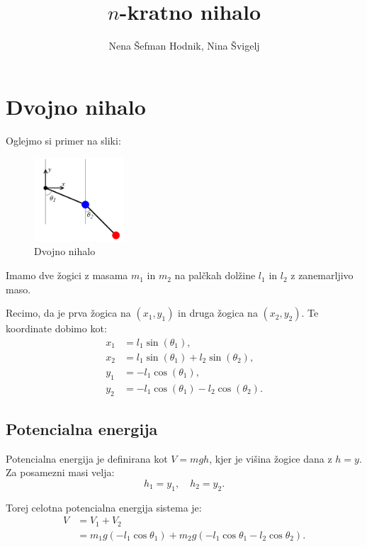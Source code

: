 \documentclass[a4paper,11pt]{article}
\begin{document}
\title{$n$-kratno nihalo}
\author{Nena Šefman Hodnik, Nina Švigelj}
\date{}
\maketitle


\section{Dvojno nihalo}

Oglejmo si primer na sliki:

\begin{figure}[h!]
    \centering
    \includegraphics[width=0.3\textwidth]{primer_dveh_slika.png}
    \caption{Dvojno nihalo \cite{scipython:doublependulum}}
    \label{fig:dvojno_nihalo}
\end{figure}

Imamo dve žogici z masama $m_1$ in $m_2$ na palčkah dolžine $l_1$ in $l_2$ z zanemarljivo maso.

Recimo, da je prva žogica na $(x_1, y_1)$ in druga žogica na $(x_2, y_2)$. Te koordinate dobimo kot:
\begin{align*}
x_1 &= l_1 \sin(\theta_1), \\
x_2 &= l_1 \sin(\theta_1) + l_2 \sin(\theta_2), \\
y_1 &= -l_1 \cos(\theta_1), \\
y_2 &= -l_1 \cos(\theta_1) - l_2 \cos(\theta_2).
\end{align*}

\subsection*{Potencialna energija}

Potencialna energija je definirana kot $V = m g h$, kjer je višina žogice dana z $h = y$. \\
Za posamezni masi velja: $$h_1 = y_1, \quad h_2 = y_2.$$

Torej celotna potencialna energija sistema je:
\begin{align*}
V &= V_1 + V_2 \\
&= m_1 g(-l_1 \cos\theta_1) + m_2 g(-l_1 \cos\theta_1 - l_2 \cos\theta_2).
\end{align*}
\end{document}
